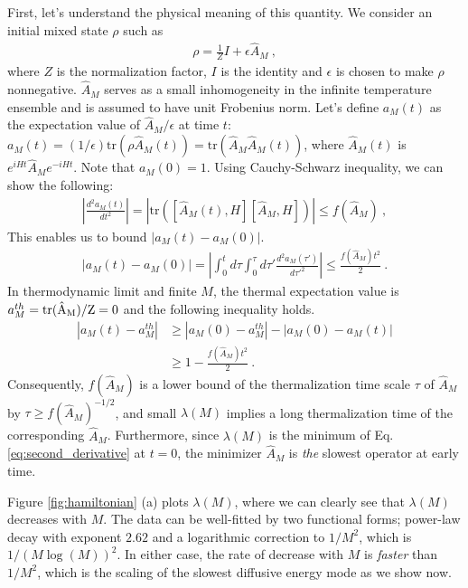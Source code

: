 \documentclass[twocolumn,superscriptaddress, prl,showpacs]{revtex4-1}
\begin{document}
First, let's understand the physical meaning of this quantity.
We consider an initial mixed state $\rho$ such as
\begin{align}\label{eq:initial}
\rho = \frac{1}{Z}I + \epsilon\hat{A}_M ~,
\end{align}
where $Z$ is the normalization factor, $I$ is the identity and $\epsilon$ is chosen to make $\rho$ nonnegative.
$\hat{A}_M$ serves as a small inhomogeneity in the infinite temperature ensemble and
is assumed to have unit Frobenius norm.
Let's define $a_M(t)$ as the expectation value of $\hat{A}_M/\epsilon$ at time $t$:
$a_M(t) = (1/\epsilon)\mathrm{tr}(\rho \hat{A}_M(t)) = \mathrm{tr}(\hat{A}_M \hat{A}_M(t))$,
where $\hat{A}_M(t)$ is $e^{iHt} \hat{A}_M e^{-iHt}$. Note that $a_M(0) = 1$.
Using Cauchy-Schwarz inequality, we can show the following:
\begin{align}
\left|\frac{d^2 a_M(t)}{dt^2}\right| = |\mathrm{tr}([\hat{A}_M(t),H][\hat{A}_M,H])| \leq f(\hat{A}_M) ~,
\label{eq:second_derivative}
\end{align}
This enables us to bound $|a_M(t) - a_M(0)|$. 
\begin{align}
|a_M(t) - a_M(0)| = \left|\int^t_0 d\tau \int^\tau_0 d\tau' \frac{d^2 a_M(\tau')}{d\tau'^2}\right| \leq \frac{f(\hat{A}_M) t^2}{2} ~.
\end{align}
In thermodynamic limit and finite $M$, the thermal expectation value is
$a_M^{th} = \rm{tr}(\hat{A}_M)/Z = 0$ and the following inequality holds. 
\begin{align}
|a_M(t) - a_M^{th}| &\geq |a_M(0) - a_M^{th}| - |a_M(0) - a_M(t)| \nonumber\\
& \geq 1 - \frac{f(\hat{A}_M)t^2}{2} ~.
\label{eq:hamiltonian_timescale}
\end{align}
Consequently, $f(\hat{A}_M)$ is a lower bound of the thermalization time scale $\tau$ of $\hat{A}_M$ by $\tau \geq f(\hat{A}_M)^{-1/2}$,
and small $\lambda(M)$ implies a long thermalization time of the corresponding $\hat{A}_M$.
Furthermore, since $\lambda(M)$ is the minimum of Eq. \eqref{eq:second_derivative} at $t =0$,
the minimizer $\hat{A}_M$ is {\it the} slowest operator at early time.


Figure \ref{fig:hamiltonian} (a) plots $\lambda (M)$, where we can clearly see that $\lambda(M)$ decreases with $M$.
The data can be well-fitted by two functional forms; power-law decay with exponent $2.62$ and a logarithmic correction to $1/M^2$, which is $1/(M\log(M))^2$.
In either case, the rate of decrease with $M$ is {\it faster} than $1/M^2$, which is the scaling of the slowest diffusive energy mode as we show now.
\end{document}

